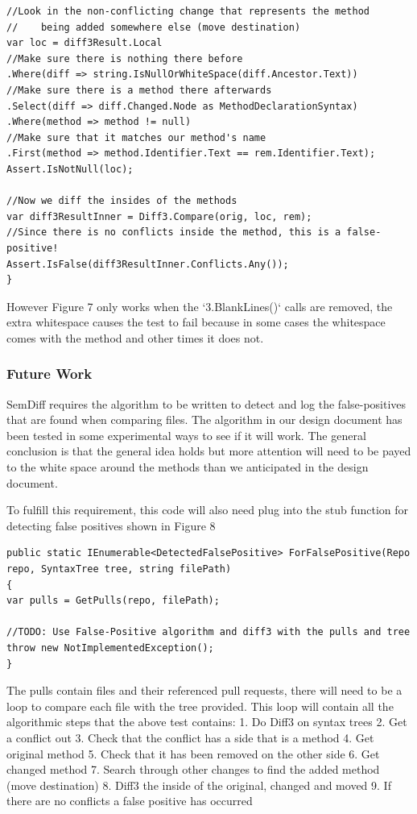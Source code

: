\documentclass[10pt,draftclsnofoot,onecolumn]{IEEEtran}
\begin{document}
\begin{lstlisting}
//Look in the non-conflicting change that represents the method 
//    being added somewhere else (move destination)
var loc = diff3Result.Local
//Make sure there is nothing there before
.Where(diff => string.IsNullOrWhiteSpace(diff.Ancestor.Text))
//Make sure there is a method there afterwards
.Select(diff => diff.Changed.Node as MethodDeclarationSyntax)
.Where(method => method != null)
//Make sure that it matches our method's name
.First(method => method.Identifier.Text == rem.Identifier.Text);
Assert.IsNotNull(loc);

//Now we diff the insides of the methods
var diff3ResultInner = Diff3.Compare(orig, loc, rem);
//Since there is no conflicts inside the method, this is a false-positive!
Assert.IsFalse(diff3ResultInner.Conflicts.Any());
}
\end{lstlisting}
\endgroup

However Figure 7 only works when the `3.BlankLines()` calls are removed, the extra whitespace causes the test to fail because in some cases the whitespace comes with the method and other times it does not.

\subsubsection{Future Work}
SemDiff requires the algorithm to be written to detect and log the false-positives that are found when comparing files. The algorithm in our design document has been tested in some experimental ways to see if it will work. The general conclusion is that the general idea holds but more attention will need to be payed to the white space around the methods than we anticipated in the design document.

To fulfill this requirement, this code will also need plug into the stub function for detecting false positives shown in Figure 8

\begingroup
\begin{lstlisting}
public static IEnumerable<DetectedFalsePositive> ForFalsePositive(Repo repo, SyntaxTree tree, string filePath)
{
var pulls = GetPulls(repo, filePath);

//TODO: Use False-Positive algorithm and diff3 with the pulls and tree
throw new NotImplementedException();
}
\end{lstlisting}
\endgroup

The pulls contain files and their referenced pull requests, there will need to be a loop to compare each file with the tree provided. This loop will contain all the algorithmic steps that the above test contains:
1.	Do Diff3 on syntax trees
2.	Get a conflict out
3.	Check that the conflict has a side that is a method
4.	Get original method
5.	Check that it has been removed on the other side
6.	Get changed method
7.	Search through other changes to find the added method (move destination)
8.	Diff3 the inside of the original, changed and moved
9.	If there are no conflicts a false positive has occurred
\end{document}
